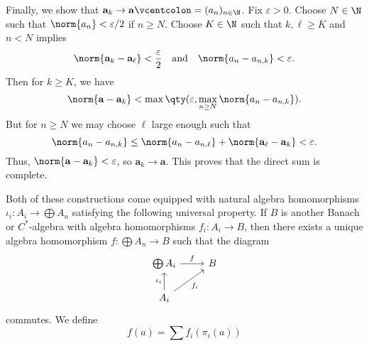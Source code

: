 Finally, we show that $\mathbf{a}_k \rightarrow \mathbf{a} \defeq (a_n)_{n \in \N}$. Fix $\varepsilon > 0$. Choose $N \in \N$ such that $\norm{a_n} < \varepsilon/2$ if $n \geq N$. Choose $K \in \N$ such that $k,\ell \geq K$ and $n < N$ implies
\begin{equation}
\norm{\mathbf{a}_k - \mathbf{a}_\ell} < \frac{\varepsilon}{2} \quad\text{and}\quad \norm{a_n - a_{n,k}} < \varepsilon.
\end{equation}
Then for $k \geq K$, we have
\begin{equation}
\norm{\mathbf{a} - \mathbf{a}_k} < \max\qty(\varepsilon, \max_{n \geq N} \norm{a_n - a_{n,k}}).
\end{equation}
But for $n \geq N$ we may choose $\ell$ large enough such that
\begin{equation}
\norm{a_n - a_{n,k}} \leq \norm{a_n - a_{n,\ell}} + \norm{\mathbf{a}_\ell - \mathbf{a}_k} < \varepsilon.
\end{equation}
Thus, $\norm{\mathbf{a} - \mathbf{a}_k} < \varepsilon$, so $\mathbf{a}_k \rightarrow \mathbf{a}$. This proves that the direct sum is complete.



Both of these constructions come equipped with natural algebra homomorphisms $\iota_i: A_i \rightarrow \bigoplus A_n$ satisfying the following universal property. If $B$ is another Banach or $C^*$-algebra with algebra homomorphisms $f_i:A_i \rightarrow B$, then there exists a unique algebra homomorphism $f:\bigoplus A_n \rightarrow  B$ such that the diagram
\begin{equation}
\begin{tikzcd}
 \bigoplus A_i \arrow[r, "f"] & B\\
 A_i \arrow[ur, "f_i"'] \arrow[u, "\iota_i"] &
\end{tikzcd}
\end{equation}
commutes. We define
\begin{equation}
f(a) = \sum f_i(\pi_i(a))
\end{equation}


